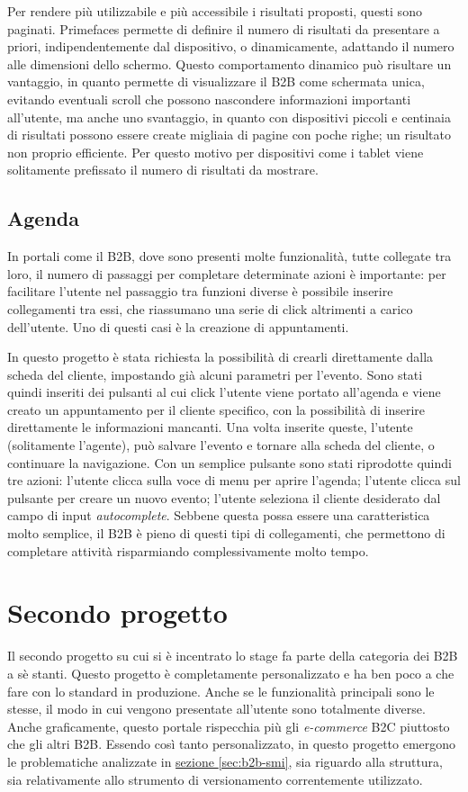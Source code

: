 Per rendere più utilizzabile e più accessibile i risultati proposti, questi sono paginati. Primefaces permette di definire il numero di risultati da presentare a priori, indipendentemente dal dispositivo, o dinamicamente, adattando il numero alle dimensioni dello schermo. Questo comportamento dinamico può risultare un vantaggio, in quanto permette di visualizzare il B2B come schermata unica, evitando eventuali scroll che possono nascondere informazioni importanti all'utente, ma anche uno svantaggio, in quanto con dispositivi piccoli e centinaia di risultati possono essere create migliaia di pagine con poche righe; un risultato non proprio efficiente. Per questo motivo per dispositivi come i tablet viene solitamente prefissato il numero di risultati da mostrare.

\subsection{Agenda}
In portali come il B2B, dove sono presenti molte funzionalità, tutte collegate tra loro, il numero di passaggi per completare determinate azioni è importante: per facilitare l'utente nel passaggio tra funzioni diverse è possibile inserire collegamenti tra essi, che riassumano una serie di click altrimenti a carico dell'utente. Uno di questi casi è la creazione di appuntamenti.

In questo progetto è stata richiesta la possibilità di crearli direttamente dalla scheda del cliente, impostando già alcuni parametri per l'evento. Sono stati quindi inseriti dei pulsanti al cui click l'utente viene portato all'agenda e viene creato un appuntamento per il cliente specifico, con la possibilità di inserire direttamente le informazioni mancanti. Una volta inserite queste, l'utente (solitamente l'agente), può salvare l'evento e tornare alla scheda del cliente, o continuare la navigazione. Con un semplice pulsante sono stati riprodotte quindi tre azioni: l'utente clicca sulla voce di menu per aprire l'agenda; l'utente clicca sul pulsante per creare un nuovo evento; l'utente seleziona il cliente desiderato dal campo di input \textit{autocomplete}. Sebbene questa possa essere una caratteristica molto semplice, il B2B è pieno di questi tipi di collegamenti, che permettono di completare attività risparmiando complessivamente molto tempo.

\section{Secondo progetto}
Il secondo progetto su cui si è incentrato lo stage fa parte della categoria dei B2B a sè stanti. Questo progetto è completamente personalizzato e ha ben poco a che fare con lo standard in produzione. Anche se le funzionalità principali sono le stesse, il modo in cui vengono presentate all'utente sono totalmente diverse. Anche graficamente, questo portale rispecchia più gli \textit{e-commerce} B2C piuttosto che gli altri B2B. Essendo così tanto personalizzato, in questo progetto emergono le problematiche analizzate in \hyperref[sec:b2b-smi]{sezione \ref{sec:b2b-smi}}, sia riguardo alla struttura, sia relativamente allo strumento di versionamento correntemente utilizzato.

